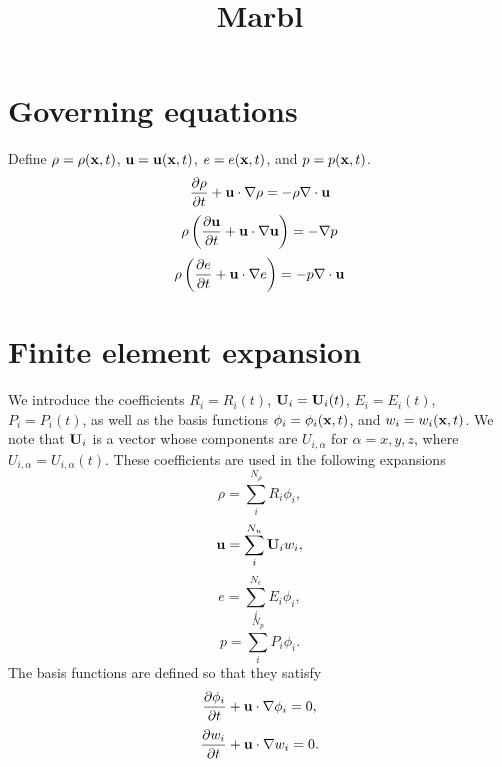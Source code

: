 \documentclass[11pt]{article}
\title{Marbl}
\begin{document}
\maketitle

\section{Governing equations}
Define $\rho = \rho(\mathbf{x},t)$, $\mathbf{u} = \mathbf{u}(\mathbf{x},t)$, $e = e(\mathbf{x},t)$, and $p = p(\mathbf{x},t)$.
\begin{equation}
    \frac{\partial \rho}{\partial t} + \mathbf{u} \cdot \nabla \rho = -\rho \nabla \cdot \mathbf{u}
\end{equation}
\begin{equation}
    \rho \left ( \frac{\partial \mathbf{u}}{\partial t} + \mathbf{u} \cdot \nabla \mathbf{u} \right ) = -\nabla p
\end{equation}
\begin{equation}
    \rho \left ( \frac{\partial e}{\partial t} + \mathbf{u} \cdot \nabla e \right ) = -p \nabla \cdot \mathbf{u}
\end{equation}

\section{Finite element expansion}
We introduce the coefficients $R_i = R_i(t)$, $\mathbf{U}_i = \mathbf{U}_i(t)$, $E_i = E_i(t)$, $P_i = P_i(t)$, as well as the basis functions $\phi_i = \phi_i(\mathbf{x},t)$, and $w_i = w_i(\mathbf{x},t)$. We note that $\mathbf{U}_i$ is a vector whose components are $U_{i,\alpha}$ for $\alpha = x,y,z$, where $U_{i,\alpha} = U_{i,\alpha}(t)$. These coefficients are used in the following expansions
\begin{equation}
    \rho = \sum_i^{N_\rho} R_i \phi_i,
\end{equation}
\begin{equation}
    \mathbf{u} = \sum_i^{N_u} \mathbf{U}_i w_i,
\end{equation}
\begin{equation}
    e = \sum_i^{N_e} E_i \phi_i,
\end{equation}
\begin{equation}
    p = \sum_i^{N_p} P_i \phi_i.
\end{equation}
The basis functions are defined so that they satisfy
\begin{equation}
    \frac{\partial \phi_i}{\partial t} + \mathbf{u} \cdot \nabla \phi_i = 0,
\end{equation}
\begin{equation}
    \frac{\partial w_i}{\partial t} + \mathbf{u} \cdot \nabla w_i = 0.
\end{equation}
\end{document}
